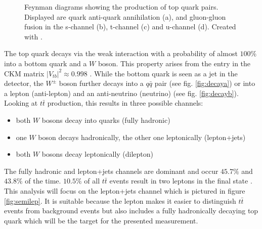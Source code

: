 \begin{figure}
\begin{subfigure}{.4\textwidth}
		\caption{}
		\label{fig:productionc}
		\end{subfigure}
		\begin{subfigure}{.4\textwidth}
		\caption{}
		\label{fig:productiond}
		\end{subfigure}
		\caption{Feynman diagrams showing the production of top quark pairs. Displayed are quark anti-quark annihilation (a), and gluon-gluon fusion in the s-channel (b), t-channel  (c) and u-channel (d). Created with \cite{feynman}.}
		\label{fig:production}
	\end{figure}	
	The top quark decays via the weak interaction with a probability of almost $100\%$ into a bottom quark and a $W$ boson. This property arises from the entry in the CKM matrix $|V_{tb}|^2 \approx 0.998$ \cite{pdg2016}. While the bottom quark is seen as a jet in the detector, the $W^\pm$ boson further decays into a $q\bar{q}$ pair (see fig. \ref{fig:decaya}) or into a lepton (anti-lepton) and an anti-neutrino (neutrino) (see fig. \ref{fig:decayb}). Looking at $t\bar{t}$ production, this results in three possible channels: 
	\begin{itemize}
	\item both $W$ bosons decay into quarks (fully hadronic)
	\item one $W$ boson decays hadronically, the other one leptonically (lepton+jets)
	\item both $W$ bosons decay leptonically (dilepton)
	\end{itemize}
	The fully hadronic and lepton+jets channels are dominant and occur $45.7\%$ and $43.8\%$ of the time. $10.5\%$ of all $t\bar{t}$ events result in two leptons in the final state \cite{pdg2016}. This analysis will focus on the lepton+jets channel which is pictured in figure \ref{fig:semilep}. It is suitable because the lepton makes it easier to distinguish $t\bar{t}$ events from background events but also includes a fully hadronically decaying top quark which will be the target for the presented measurement.
	
